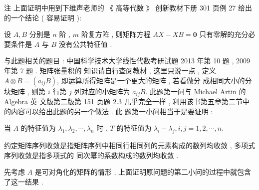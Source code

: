 \documentclass[10pt]{article}
\begin{document}
 注   上面证明中用到下维声老师的 《 高等代数 》 创新教材下册  301  页例  27  给出的一个结论  ( 容易证明 ):

 设  $A, B$  分别是  $n$  阶 , $m$  阶复方阵 ,  则矩阵方程  $A X-X B=\mathbf{0}$  只有零解的充分必要条件是  $A$  与  $B$  没有公共特征值 .

 与此题相关的题目 :  中国科学技术大学线性代数考研试题  2013  年第  10  题 , 2009  年第  7  题 .  矩阵张量积的   知识请自行查阅教材 ,  这里只说一点 ,  定义  $A \otimes B=\left(a_{i j} B\right)$,  即运算所得矩阵是一个更大的矩阵 ,  若看做分   成相同大小的分块矩阵 ,  则第  $i$  行第  $j$  列对应的小矩阵为  $a_{i j} B$.  此题第一问与  Michael Artin  的  Algebra  英   文版第二版第  151  页题  $2.3$  几乎完全一样 ,  利用该书第五章第二节中的内容可以给出此题的另一个做法 .  此   题第一小问相当于是要证明 :

 当  $A$  的特征值为  $\lambda_{1}, \lambda_{2}, \cdots, \lambda_{n}$  时 , $T$  的特征值为  $\lambda_{i}-\lambda_{j}, i, j=1,2, \cdots, n$.

 约定矩阵序列收敛是指矩阵序列中相同行相同列的元素构成的数列均收敛 ,  多项式序列收敛是指多项式的   同次幂的系数构成的数列均收敛 .

 先考虑  $A$  是可对角化的矩阵的情形 ,  上面证明原问题的第二小问的过程中就包含了这一结果 .
\end{document}
